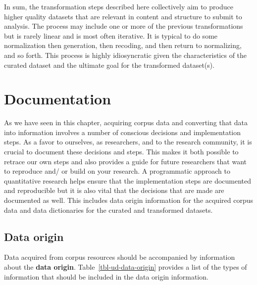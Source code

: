 \documentclass[
  letterpaper,
]{latex/krantz}
\theoremstyle{definition}
\theoremstyle{remark}
\begin{document}
In sum, the transformation steps described here collectively aim to
produce higher quality datasets that are relevant in content and
structure to submit to analysis. The process may include one or more of
the previous transformations but is rarely linear and is most often
iterative. It is typical to do some normalization then generation, then
recoding, and then return to normalizing, and so forth. This process is
highly idiosyncratic given the characteristics of the curated dataset
and the ultimate goal for the transformed dataset(s).

\section{Documentation}\label{sec-ud-documentation}

As we have seen in this chapter, acquiring corpus data and converting
that data into information involves a number of conscious decisions and
implementation steps. As a favor to ourselves, as researchers, and to
the research community, it is crucial to document these decisions and
steps. This makes it both possible to retrace our own steps and also
provides a guide for future researchers that want to reproduce and/ or
build on your research. A programmatic approach to quantitative research
helps ensure that the implementation steps are documented and
reproducible but it is also vital that the decisions that are made are
documented as well. This includes data origin information for the
acquired corpus data and data dictionaries for the curated and
transformed datasets.

\subsection{Data origin}\label{sec-ud-data-origin}

Data acquired from corpus resources should be accompanied by information
about the \textbf{data origin}. Table~\ref{tbl-ud-data-origin} provides
a list of the types of information that should be included in the data
origin information.
\end{document}
